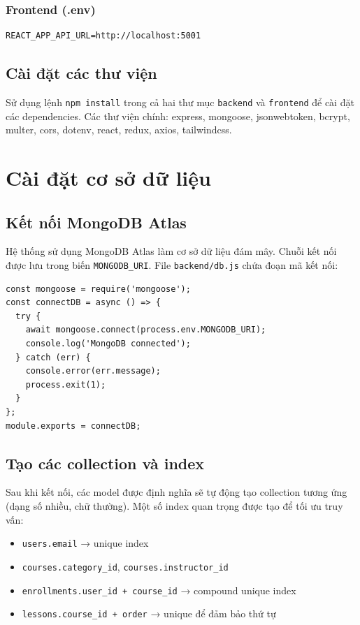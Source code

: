 \subsubsection{Frontend (.env)}
\begin{verbatim}
REACT_APP_API_URL=http://localhost:5001
\end{verbatim}

\subsection{Cài đặt các thư viện}
Sử dụng lệnh \texttt{npm install} trong cả hai thư mục \texttt{backend} và \texttt{frontend} để cài đặt các dependencies. Các thư viện chính: express, mongoose, jsonwebtoken, bcrypt, multer, cors, dotenv, react, redux, axios, tailwindcss.

\section{Cài đặt cơ sở dữ liệu}

\subsection{Kết nối MongoDB Atlas}
Hệ thống sử dụng MongoDB Atlas làm cơ sở dữ liệu đám mây. Chuỗi kết nối được lưu trong biến \texttt{MONGODB\_URI}. File \texttt{backend/db.js} chứa đoạn mã kết nối:

\begin{verbatim}
const mongoose = require('mongoose');
const connectDB = async () => {
  try {
    await mongoose.connect(process.env.MONGODB_URI);
    console.log('MongoDB connected');
  } catch (err) {
    console.error(err.message);
    process.exit(1);
  }
};
module.exports = connectDB;
\end{verbatim}

\subsection{Tạo các collection và index}
Sau khi kết nối, các model được định nghĩa sẽ tự động tạo collection tương ứng (dạng số nhiều, chữ thường). Một số index quan trọng được tạo để tối ưu truy vấn:
\begin{itemize}
    \item \texttt{users.email} → unique index
    \item \texttt{courses.category\_id}, \texttt{courses.instructor\_id}
    \item \texttt{enrollments.user\_id + course\_id} → compound unique index
    \item \texttt{lessons.course\_id + order} → unique để đảm bảo thứ tự
\end{itemize}

